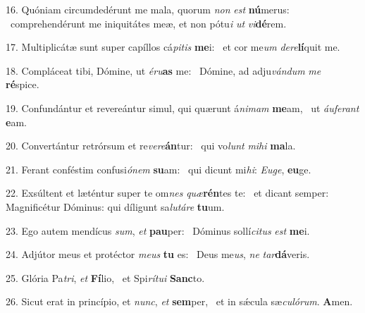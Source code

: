 16. Quóniam circumdedérunt me mala, quorum \textit{non} \textit{est} \textbf{nú}merus: \ast\  comprehendérunt me iniquitátes meæ, et non pótu\textit{i} \textit{ut} \textit{vi}\textbf{dé}rem.\

17. Multiplicátæ sunt super capíllos cá\textit{pi}\textit{tis} \textbf{me}i: \ast\  et cor me\textit{um} \textit{de}\textit{re}\textbf{lí}quit me.\

18. Compláceat tibi, Dómine, ut \textit{é}\textit{ru}\textbf{as} me: \ast\  Dómine, ad adju\textit{ván}\textit{dum} \textit{me} \textbf{ré}spice.\

19. Confundántur et revereántur simul, qui quærunt á\textit{ni}\textit{mam} \textbf{me}am, \ast\  ut \textit{áu}\textit{fe}\textit{rant} \textbf{e}am.\

20. Convertántur retrórsum et re\textit{ve}\textit{re}\textbf{án}tur: \ast\  qui vo\textit{lunt} \textit{mi}\textit{hi} \textbf{ma}la.\

21. Ferant conféstim confusi\textit{ó}\textit{nem} \textbf{su}am: \ast\  qui dicunt mi\textit{hi}: \textit{Eu}\textit{ge}, \textbf{eu}ge.\

22. Exsúltent et læténtur super te om\textit{nes} \textit{quæ}\textbf{rén}tes te: \ast\  et dicant semper: Magnificétur Dóminus: qui díligunt sa\textit{lu}\textit{tá}\textit{re} \textbf{tu}um.\

23. Ego autem mendícus \textit{sum}, \textit{et} \textbf{pau}per: \ast\  Dóminus sollí\textit{ci}\textit{tus} \textit{est} \textbf{me}i.\

24. Adjútor meus et protéctor \textit{me}\textit{us} \textbf{tu} es: \ast\  Deus me\textit{us}, \textit{ne} \textit{tar}\textbf{dá}veris.\

25. Glória Pa\textit{tri}, \textit{et} \textbf{Fí}lio, \ast\  et Spi\textit{rí}\textit{tu}\textit{i} \textbf{Sanc}to.\

26. Sicut erat in princípio, et \textit{nunc}, \textit{et} \textbf{sem}per, \ast\  et in sǽcula sæ\textit{cu}\textit{ló}\textit{rum}. \textbf{A}men.\

